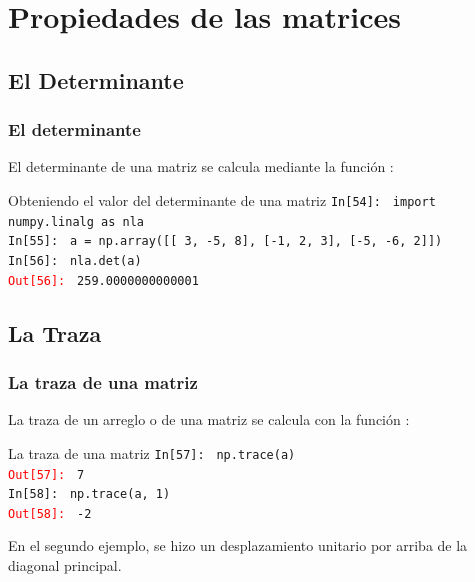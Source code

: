 \section{Propiedades de las matrices}
\subsection{El Determinante}
\begin{frame}[fragile]
\frametitle{El determinante}
El determinante de una matriz se calcula mediante la función :
\fontsize{12}{12}\selectfont
\begin{exampleblock}{Obteniendo el valor del determinante de una matriz}
\textcolor{ao}{\texttt{In[54]: }} \texttt{import numpy.linalg as nla} \\
\medskip
\pause
\textcolor{ao}{\texttt{In[55]: }} \texttt{a = np.array([[ 3, -5, 8], [-1, 2, 3], [-5, -6, 2]])} \\
\medskip
\pause
\textcolor{ao}{\texttt{In[56]: }} \texttt{nla.det(a)} \\
\medskip
\pause
\textcolor{red}{\texttt{Out[56]: }} \texttt{259.0000000000001}
\end{exampleblock}
\end{frame}
\subsection{La Traza}
\begin{frame}[fragile]
\frametitle{La traza de una matriz}
La traza de un arreglo o de una matriz se calcula con la función :
\fontsize{12}{12}\selectfont
\begin{exampleblock}{La traza de una matriz}
\textcolor{ao}{\texttt{In[57]: }} \texttt{np.trace(a)} \\
\medskip
\pause
\textcolor{red}{\texttt{Out[57]: }} \texttt{7} \\
\medskip
\pause
\textcolor{ao}{\texttt{In[58]: }} \texttt{np.trace(a, 1)} \\
\medskip
\pause
\textcolor{red}{\texttt{Out[58]: }} \texttt{-2}
\end{exampleblock}
En el segundo ejemplo, se hizo un desplazamiento unitario por arriba de la diagonal principal.
\end{frame}
